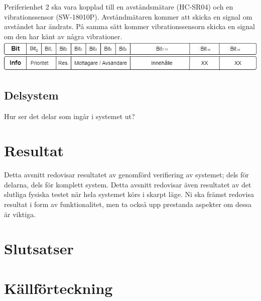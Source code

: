 \documentclass{article}
\begin{document}
Periferienhet 2 ska vara kopplad till en avståndsmätare (HC-SR04) och en vibrationssensor (SW-18010P). Avståndmätaren kommer att skicka en signal om avståndet har ändrats. På samma sätt kommer vibrationssensorn skicka en signal om den har känt av några vibrationer. \\


\includegraphics[scale=0.5]{Projektrapport/protokoll.png}

\subsection{Delsystem}
Hur ser det delar som ingår i systemet ut?

\section{Resultat}
Detta avsnitt redovisar resultatet av genomförd verifiering av systemet; dels för delarna, dels för komplett system. 
Detta avsnitt redovisar även resultatet av det slutliga fysiska testet när hela systemet körs i skarpt läge. 
Ni ska främst redovisa resultat i form av funktionalitet, men ta också upp prestanda aspekter om dessa är viktiga.  

\section{Slutsatser}


\newpage
\section{Källförteckning}
\printbibliography[heading=none]
\end{document}
